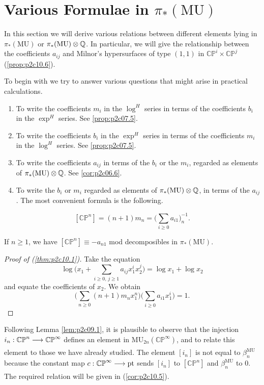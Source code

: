 \documentclass[../main]{subfiles}
\begin{document}
\chapter{Various Formulae in \texorpdfstring{$\pi_\ast(\mathrm{MU})$}{pi (MU)}}
\label{sec:p2c10}
In this section we will derive various relations between different elements lying in $\pi_\ast(\mathrm{MU})$ or $\pi_\ast(\mathrm{MU}) \otimes \mathbb{Q}$. In particular, we will give the relationship between the coefficients $a_{ij}$ and Milnor's hypersurfaces of type $(1,1)$ in $\mathbb {CP}^i \times \mathbb {CP}^j$ (\ref{prop:p2c10.6}).

To begin with we try to answer various questions that might arise in practical calculations.

\begin{enumerate}
    \item[(i)] To write the coefficients $m_i$ in the $\log^H$ series in terms of the coefficients $b_i$ in the $\exp^H$ series. See \ref{prop:p2c07.5}.
    \item[(ii)] To write the coefficients $b_i$ in the $\exp^H$ series in terms of the coefficients $m_i$ in the $\log^H$ series. See \ref{prop:p2c07.5}.
    \item[(iii)] To write the coefficients $a_{ij}$ in terms of the $b_i$ or the $m_i$, regarded as elements of $\pi_\ast(\mathrm{MU}) \otimes \mathbb{Q}$. See \eqref{cor:p2c06.6}.
    \item[(iv)] To write the $b_i$ or $m_i$ regarded as elements of $\pi_\ast(\mathrm {MU}) \otimes \mathbb{Q}$, in terms of the $a_{ij}$. The most convenient formula is the following. 
\end{enumerate}

\begin{theorem}
\label{thm:p2c10.1}
\begin{equation}
        \tag{10.1}
        [\mathbb {CP}^n] = (n + 1)m_n = \bigg(\sum_{i \ge 0} a_{i1}\bigg)_n^{-1}.
\end{equation}
\end{theorem}

\begin{corollary}
\label{cor:p2c10.2}
If $n \ge 1$, we have $[\mathbb {CP}^n] \equiv -a_{n1}$ mod decomposibles in $\pi_\ast(\mathrm{MU})$.
\end{corollary}

\begin{proof}[Proof of (\ref{thm:p2c10.1})]
Take the equation \[\log \bigg(x_1 + \sum_{i \ge 0, \, j \ge 1} a_{ij} x_1^i x_2^j\bigg) = \log x_1 + \log x_2\] and equate the coefficients of $x_2$. We obtain \[\bigg(\sum_{n \ge 0} (n + 1) m_n x_1^n\bigg) \bigg(\sum_{i \ge 0} a_{i1} x_1^i\bigg) = 1.\]
\end{proof}
Following Lemma \ref{lem:p2c09.1}, it is plausible to observe that the injection $i_n : \mathbb {CP}^n \lar{} \mathbb {CP}^\infty$ defines an element in $\mathrm {MU}_{2n} (\mathbb {CP}^\infty)$, and to relate this element to those we have already studied. The element $[i_n]$ is not equal to $\beta_n^{\mathrm{MU}}$ because the constant map $c : \mathbb{CP}^\infty \lar{} \mathrm{pt}$ sends $[i_n]$ to $[\mathbb {CP}^n]$ and $\beta_n^{\mathrm{MU}}$ to $0$. The required relation will be given in (\ref{cor:p2c10.5}).
\end{document}
